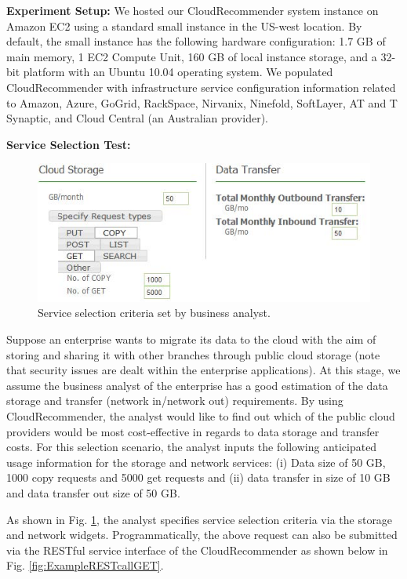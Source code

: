 \textbf{Experiment Setup:} We hosted our CloudRecommender system instance on Amazon
EC2 using a standard small instance in the US-west location. By default, the small
instance has the following hardware configuration: 1.7 GB of main memory, 1 EC2
Compute Unit, 160 GB of local instance storage, and a 32-bit platform with an
Ubuntu 10.04 operating system. We populated CloudRecommender with
infrastructure service configuration information related to Amazon, Azure, GoGrid,
RackSpace, Nirvanix, Ninefold, SoftLayer, AT and T Synaptic, and Cloud Central (an
Australian provider).

\textbf{Service Selection Test:}
\begin{figure}[!ht]
  \includegraphics[width=\textwidth,keepaspectratio]{Figures/system/CloudRecommender/ServiceSelectionTestCase.jpg}
  \caption{Service selection criteria set by business analyst.}
  \label{fig:ServiceSelectionTestCase}
\end{figure}
Suppose an enterprise wants to migrate its data to the
cloud with the aim of storing and sharing it with other branches through public cloud
storage (note that security issues are dealt within the enterprise applications). At this
stage, we assume the business analyst of the enterprise has a good estimation of the
data storage and transfer (network in/network out) requirements. By using
CloudRecommender, the analyst would like to find out which of the public cloud
providers would be most cost-effective in regards to data storage and transfer costs.
For this selection scenario, the analyst inputs the following anticipated usage
information for the storage and network services: (i) Data size of 50 GB, 1000 copy
requests and 5000 get requests and (ii) data transfer in size of 10 GB and data transfer
out size of 50 GB.

As shown in Fig. \ref{fig:ServiceSelectionTestCase}, the analyst specifies service selection criteria via the storage and network widgets. Programmatically, the above request can also be submitted via the
RESTful service interface of the CloudRecommender as shown below in Fig. \ref{fig:ExampleRESTcallGET}.

